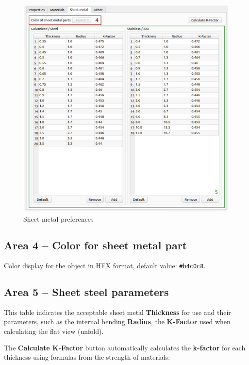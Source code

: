 \documentclass[a4paper,12pt]{article}
\begin{document}
\pagebreak

\begin{figure}[htp]
	\centering
	\includegraphics[width=1\textwidth]{img/pref_sm.png}
	\caption{Sheet metal preferences}
	\label{sec:pref_sm}
\end{figure}

\subsection{Area 4 -- Color for sheet metal part}
Color display for the object in HEX format, default value: \verb|#b4c0c8|.

\subsection{Area 5 -- Sheet steel parameters}
This table indicates the acceptable sheet metal \textbf{Thickness} for use and their parameters, such as the internal bending \textbf{Radius}, the \textbf{K-Factor} used when calculating the flat view (unfold).\\

\pagebreak

The \textbf{Calculate K-Factor} button automatically calculates the \textbf{k-factor} for each thickness using formulas from the strength of materials:
\end{document}
